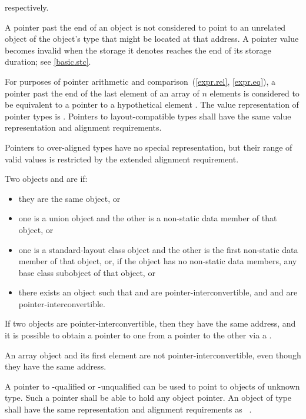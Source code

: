 respectively.
\begin{note}
A pointer past the end of an object
is not considered to point to an unrelated object
of the object's type
that might be located at that address.
A pointer value becomes invalid
when the storage it denotes
reaches the end of its storage duration;
see \ref{basic.stc}.
\end{note}
For purposes of pointer arithmetic
and comparison~(\ref{expr.rel}, \ref{expr.eq}),
a pointer past the end of the last element of
an array  of $n$ elements
is considered to be equivalent to
a pointer to a hypothetical element .
The value representation of
pointer types is . Pointers to
layout-compatible types shall
have the same value representation and alignment
requirements.
\begin{note} Pointers to over-aligned types have no special
representation, but their range of valid values is restricted by the extended
alignment requirement.\end{note}

\pnum
Two objects  and  are  if:
\begin{itemize}
\item
they are the same object, or
\item
one is a union object and
the other is a non-static data member of that object, or
\item
one is a standard-layout class object and
the other is the first non-static data member of that object, or,
if the object has no non-static data members,
any base class subobject of that object, or
\item
there exists an object  such that
 and  are pointer-interconvertible, and
 and  are pointer-interconvertible.
\end{itemize}
If two objects are pointer-interconvertible,
then they have the same address,
and it is possible to obtain a pointer to one
from a pointer to the other
via a .
\begin{note}
An array object and its first element are not pointer-interconvertible,
even though they have the same address.
\end{note}

\pnum
{}%
%
A pointer to \cv-qualified or \cv-unqualified
can be used to point to objects of
unknown type. Such a pointer shall be able to hold any object pointer.
An object of type \cv{}~
shall have the same representation and alignment
requirements as \cv{}~.

